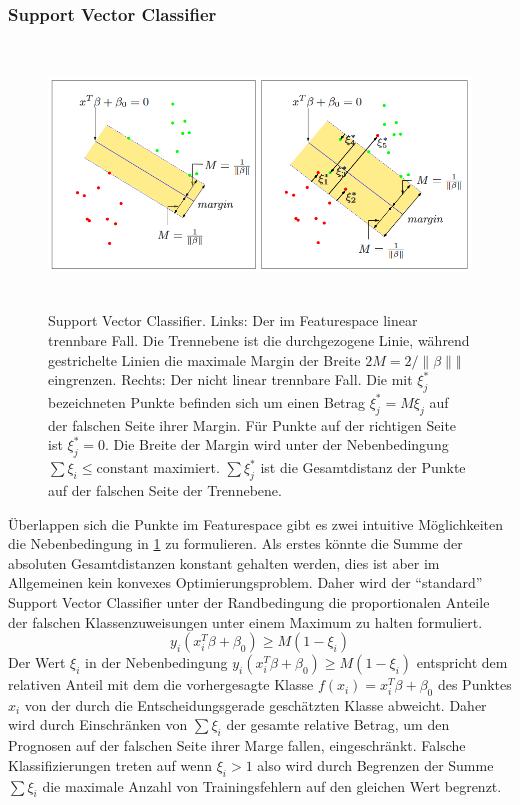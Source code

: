 \subsubsection{Support Vector Classifier}

\begin{figure}[H]
    \centering
    \includegraphics[width = 13cm, height = 7cm]{Figures/svmargin.PNG}
    \caption{Support Vector Classifier. Links: Der im Featurespace linear trennbare Fall. Die Trennebene ist die durchgezogene Linie, während gestrichelte Linien die maximale Margin der Breite $2M=2/\|\beta\|‖$ eingrenzen. Rechts: Der nicht linear trennbare Fall. Die mit $\xi_{j}^{*}$ bezeichneten Punkte befinden sich um einen Betrag $\xi_{j}^{*}= M \xi_{j}$ auf der falschen Seite ihrer Margin. Für Punkte auf der richtigen Seite ist $\xi_{j}^{*}=0$. Die Breite der Margin wird unter der Nebenbedingung $\sum \xi_{i} \leq \text {constant}$ maximiert. $\sum \xi_{j}^{*}$ ist die Gesamtdistanz der Punkte auf der falschen Seite der Trennebene.\cite{svclassifier}}
    \label{svclassif}
\end{figure}

Überlappen sich die Punkte im Featurespace gibt es zwei intuitive Möglichkeiten die Nebenbedingung in \ref{svclassif} zu formulieren. Als erstes könnte die Summe der absoluten Gesamtdistanzen konstant gehalten werden, dies ist aber im Allgemeinen kein konvexes Optimierungsproblem. Daher wird der ``standard'' Support Vector Classifier unter der Randbedingung die proportionalen Anteile der falschen Klassenzuweisungen unter einem Maximum zu halten formuliert. 
\begin{equation}
    \label{eqsvmoptim}
    y_{i}\left(x_{i}^{T} \beta+\beta_{0}\right) \geq M\left(1-\xi_{i}\right)
\end{equation}
Der Wert $\xi_{i}$ in der Nebenbedingung $y_{i}\left(x_{i}^{T} \beta+\beta_{0}\right) \geq M\left(1-\xi_{i}\right)$ entspricht dem relativen Anteil mit dem die vorhergesagte Klasse $f\left(x_{i}\right)=x_{i}^{T} \beta+\beta_{0}$ des Punktes $x_{i}$ von der durch die Entscheidungsgerade geschätzten Klasse abweicht. Daher wird durch Einschränken von $\sum \xi_{i}$ der gesamte relative Betrag, um den Prognosen auf der falschen Seite ihrer Marge fallen, eingeschränkt. Falsche Klassifizierungen treten auf wenn $\xi_{i}>1$ also wird durch Begrenzen der Summe  $\sum \xi_{i}$ die maximale Anzahl von Trainingsfehlern auf den gleichen Wert begrenzt. \cite{svclassifier}

